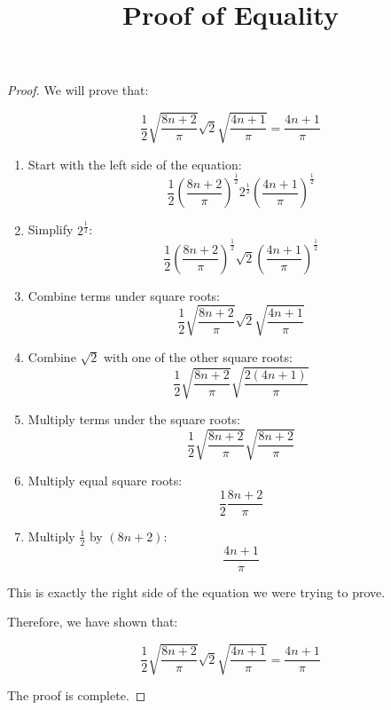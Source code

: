 \documentclass{article}
\begin{document}
\title{Proof of Equality}
\maketitle

\begin{proof}
We will prove that:

\[\frac{1}{2}\sqrt{\frac{8n+2}{\pi}}\sqrt{2}\sqrt{\frac{4n+1}{\pi}} = \frac{4n+1}{\pi}\]

\begin{enumerate}
    \item Start with the left side of the equation:
    \[\frac{1}{2}\left(\frac{8n+2}{\pi}\right)^{\frac{1}{2}}2^{\frac{1}{2}}\left(\frac{4n+1}{\pi}\right)^{\frac{1}{2}}\]
    
    \item Simplify $2^{\frac{1}{2}}$:
    \[\frac{1}{2}\left(\frac{8n+2}{\pi}\right)^{\frac{1}{2}}\sqrt{2}\left(\frac{4n+1}{\pi}\right)^{\frac{1}{2}}\]
    
    \item Combine terms under square roots:
    \[\frac{1}{2}\sqrt{\frac{8n+2}{\pi}}\sqrt{2}\sqrt{\frac{4n+1}{\pi}}\]
    
    \item Combine $\sqrt{2}$ with one of the other square roots:
    \[\frac{1}{2}\sqrt{\frac{8n+2}{\pi}}\sqrt{\frac{2(4n+1)}{\pi}}\]
    
    \item Multiply terms under the square roots:
    \[\frac{1}{2}\sqrt{\frac{8n+2}{\pi}}\sqrt{\frac{8n+2}{\pi}}\]
    
    \item Multiply equal square roots:
    \[\frac{1}{2}\frac{8n+2}{\pi}\]
    
    \item Multiply $\frac{1}{2}$ by $(8n+2)$:
    \[\frac{4n+1}{\pi}\]
\end{enumerate}

This is exactly the right side of the equation we were trying to prove.

Therefore, we have shown that:

\[\frac{1}{2}\sqrt{\frac{8n+2}{\pi}}\sqrt{2}\sqrt{\frac{4n+1}{\pi}} = \frac{4n+1}{\pi}\]

The proof is complete.
\end{proof}
\end{document}
